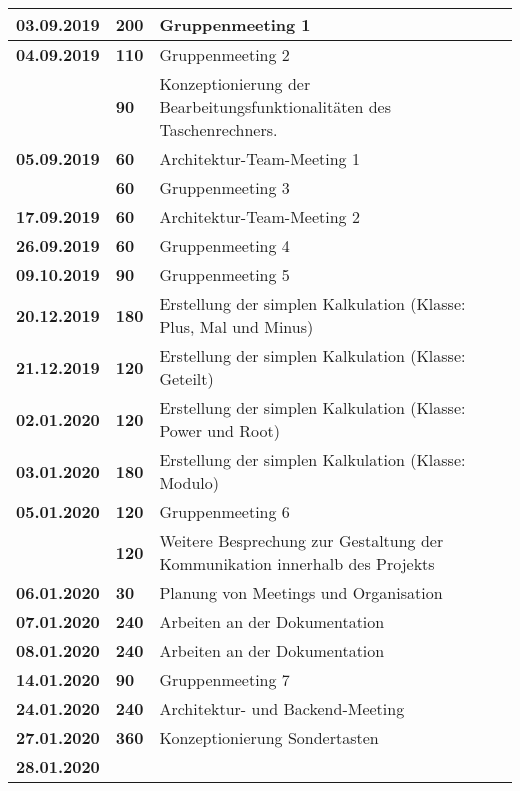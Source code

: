{{\begin{longtable}{|l|l|p{11cm}|}
		\textbf{03.09.2019} 
		& \textbf{\hfill 200} & Gruppenmeeting 1
		\\ \hline \textbf{04.09.2019}
		& \textbf{\hfill 110} & Gruppenmeeting 2 \\\cline{2-3}
		& \textbf{\hfill 90} & Konzeptionierung der Bearbeitungsfunktionalitäten des Taschenrechners.
		\\ \hline \textbf{05.09.2019}
		& \textbf{\hfill 60} & Architektur-Team-Meeting 1 \\\cline{2-3}
		& \textbf{\hfill 60} & Gruppenmeeting 3
		\\ \hline \textbf{17.09.2019}
		& \textbf{\hfill 60} & Architektur-Team-Meeting 2
		\\ \hline \textbf{26.09.2019}
		& \textbf{\hfill 60} & Gruppenmeeting 4
		\\ \hline \textbf{09.10.2019}
		& \textbf{\hfill 90} & Gruppenmeeting 5
		\\ \hline \textbf{20.12.2019}
		& \textbf{\hfill 180} & Erstellung der simplen Kalkulation (Klasse: Plus, Mal und Minus)
		\\ \hline \textbf{21.12.2019}
		& \textbf{\hfill 120} & Erstellung der simplen Kalkulation (Klasse: Geteilt)
		\\ \hline \textbf{02.01.2020}
		& \textbf{\hfill 120} & Erstellung der simplen Kalkulation (Klasse: Power und Root)
		\\ \hline \textbf{03.01.2020}
		& \textbf{\hfill 180} & Erstellung der simplen Kalkulation (Klasse: Modulo)
		\\ \hline \textbf{05.01.2020}
		& \textbf{\hfill 120} & Gruppenmeeting 6  \\\cline{2-3}
		& \textbf{\hfill 120} & Weitere Besprechung zur Gestaltung der Kommunikation innerhalb des Projekts
		\\ \hline \textbf{06.01.2020}
		& \textbf{\hfill 30} & Planung von Meetings und Organisation
		\\ \hline \textbf{07.01.2020}
		& \textbf{\hfill 240} & Arbeiten an der Dokumentation
		\\ \hline \textbf{08.01.2020}
		& \textbf{\hfill 240} & Arbeiten an der Dokumentation
		\\ \hline \textbf{14.01.2020}
		& \textbf{\hfill 90} & Gruppenmeeting 7
		\\ \hline \textbf{24.01.2020}
		& \textbf{\hfill 240} & Architektur- und Backend-Meeting
		\\ \hline \textbf{27.01.2020}
		& \textbf{\hfill 360} & Konzeptionierung Sondertasten
		\\ \hline \textbf{28.01.2020}

\end{longtable}}}
